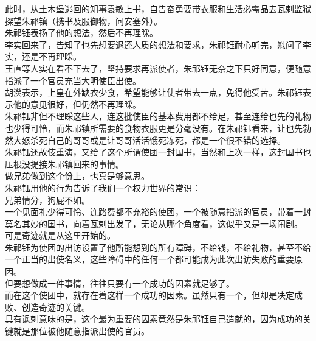 \begin{multicols}{\theparacolNo}
此时，从土木堡逃回的知事袁敏上书，自告奋勇要带衣服和生活必需品去瓦剌监狱探望朱祁镇（携书及服御物，问安塞外）。\\

朱祁钰表扬了他的想法，然后不再理睬。\\

李实回来了，告知了也先想要退还人质的想法和要求，朱祁钰耐心听完，慰问了李实，还是不再理睬。\\

王直等人实在看不下去了，坚持要求再派使者，朱祁钰无奈之下只好同意，便随意指派了一个官员充当大明使臣出使。\\

胡濙表示，上皇在外缺衣少食，希望能够让使者带去一点，免得他受苦。朱祁钰表示他的意见很好，但仍然不再理睬。\\

朱祁钰非但不理睬这些人，连这批使臣的基本费用都不给足，甚至连给也先的礼物也少得可怜，而朱祁镇所需要的食物衣服更是分毫没有。在朱祁钰看来，让也先勃然大怒杀死自己的哥哥或是让哥哥活活饿死冻死，都是一个很不错的选择。\\

朱祁钰还故伎重演，又给了这个所谓使团一封国书，当然和上次一样，这封国书也压根没提接朱祁镇回来的事情。\\

做兄弟做到这个份上，也真是够意思。\\

朱祁钰用他的行为告诉了我们一个权力世界的常识：\\

兄弟情分，狗屁不如。\\

一个见面礼少得可怜、连路费都不充裕的使团，一个被随意指派的官员，带着一封莫名其妙的国书，向着瓦剌出发了，无论从哪个角度看，这似乎又是一场闹剧。\\

可是奇迹就是从这里开始的。\\

朱祁钰为使团的出访设置了他所能想到的所有障碍，不给钱，不给礼物，甚至不给一个正当的出使名义，这些障碍中的任何一个都可能成为此次出访失败的重要原因。\\

但要想做成一件事情，往往只要有一个成功的因素就足够了。\\

而在这个使团中，就存在着这样一个成功的因素。虽然只有一个，但却是决定成败、创造奇迹的关键。\\

具有讽刺意味的是，这个最为重要的因素竟然是朱祁钰自己造就的，因为成功的关键就是那位被他随意指派出使的官员。\\


\end{multicols}
